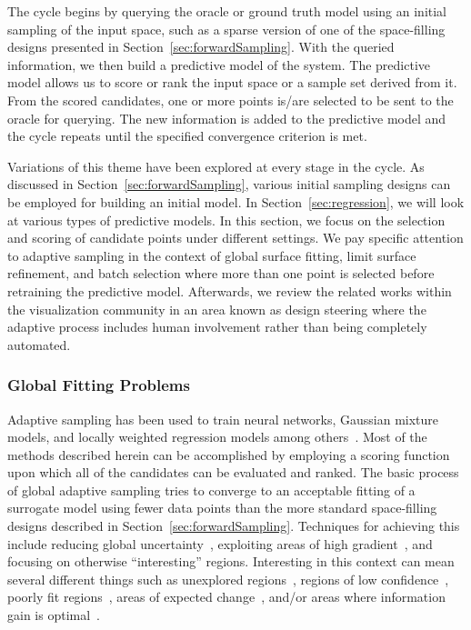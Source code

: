 The cycle begins by querying the oracle or ground truth model using an initial sampling of the input space, such as a sparse version of one of the space-filling designs presented in Section~\ref{sec:forwardSampling}.
%
With the queried information, we then build a predictive model of the system.
%
%
The predictive model allows us to score or rank the input space or a sample set derived from it.
%
From the scored candidates, one or more points is/are selected to be sent to the oracle for querying.
%
The new information is added to the predictive model and the cycle repeats until the specified convergence criterion is met.

Variations of this theme have been explored at every stage in the cycle.
%
As discussed in Section~\ref{sec:forwardSampling}, various initial sampling designs can be employed for building an initial model.
%
In Section~\ref{sec:regression}, we will look at various types of predictive models.
%
In this section, we focus on the selection and scoring of candidate points under different settings.
%
We pay specific attention to adaptive sampling in the context of global surface fitting, limit surface refinement, and batch selection where more than one point is selected before retraining the predictive model.
%
Afterwards, we review the related works within the visualization community in an area known as design steering where the adaptive process includes human involvement rather than being completely automated.

\subsubsection{Global Fitting Problems}

Adaptive sampling has been used to train neural networks, Gaussian mixture models, and locally weighted regression models among others~\cite{CohnGhahramaniJordan1996}.
%
Most of the methods described herein can be accomplished by employing a scoring function upon which all of the candidates can be evaluated and ranked.
%
The basic process of global adaptive sampling tries to converge to an acceptable fitting of a surrogate model using fewer data points than the more standard space-filling designs described in Section~\ref{sec:forwardSampling}.
%
Techniques for achieving this include reducing global uncertainty~\cite{CohnGhahramaniJordan1996,TongKoller2001}, exploiting areas of high gradient~\cite{MaljovecWangKupresanin2013}, and focusing on otherwise ``interesting'' regions.
%
Interesting in this context can mean several different things such as unexplored regions~\cite{Whitehead1991}, regions of low confidence~\cite{ThrunMoller1992}, poorly fit regions~\cite{LindenWeber1993}, areas of expected change~\cite{CohnAtlasLadner1990, CohnAtlasLadner1994}, and/or areas where information gain is optimal~\cite{Lam2008}.

